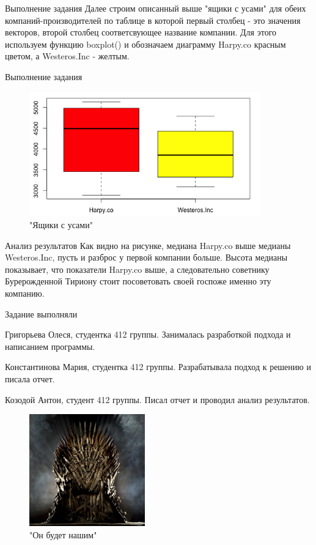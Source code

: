 \documentclass{beamer}
\begin{document}
\begin{frame}{Выполнение задания}
Далее строим описанный выше "ящики с усами"  для обеих компаний-производителей по таблице в которой первый столбец - это значения векторов, второй столбец соответсвующее название компании. 
Для этого используем функцию boxplot() и обозначаем диаграмму Harpy.co красным цветом, а Westeros.Inc - желтым.

\end{frame}

\begin{frame}{Выполнение задания}	
	\begin{figure}[h]
		\includegraphics[width=100mm]{ysi}
		\caption{"Ящики с усами"}
		\label{ysi}
	\end{figure}
\end{frame}

\begin{frame}{Анализ результатов}
Как видно на рисунке, медиана Harpy.co выше медианы Westeros.Inc, пусть и разброс у первой компании больше. Высота медианы показывает, что показатели Harpy.co выше, а следовательно советнику Бурерожденной Тириону стоит посоветовать своей госпоже именно эту компанию.
\end{frame}

\begin{frame}{Задание выполняли}
	\begin{itemize}
		{\tiny \item Григорьева Олеся, студентка 412 группы. Занималась разработкой подхода и написанием программы.
		\item Константинова Мария, студентка 412 группы. Разрабатывала подход к решению и писала отчет.
		\item Козодой Антон, студент 412 группы. Писал отчет и проводил анализ результатов.
				}
	\end{itemize}	
	\begin{figure}[h]
		\includegraphics[width=50mm]{tron}
		\caption{"Он будет нашим"}
		\label{tron}
	\end{figure}

\end{frame}
\end{document}
